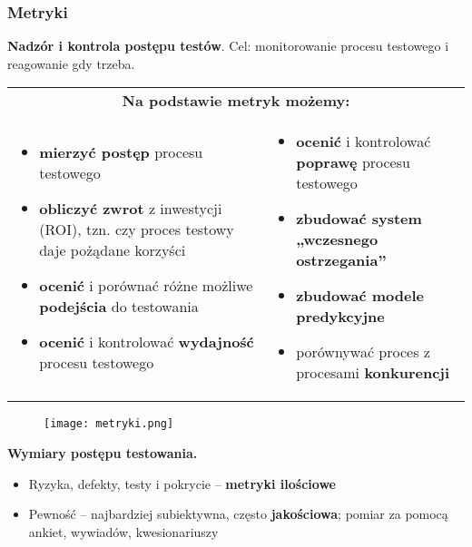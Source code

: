 \documentclass[../main.tex]{subfiles}
\begin{document}
    \subsubsection{Metryki}

    \textbf{Nadzór i kontrola postępu testów}. Cel: monitorowanie procesu testowego i reagowanie gdy trzeba.

    \begin{table}[H]
        \begin{center}
            \begin{tabular}{p{8cm} p{8cm}}
                \multicolumn{2}{c}{\textbf{ Na podstawie metryk możemy:}}\\
                \begin{itemize}
                    \item \textbf{mierzyć postęp} procesu testowego
                    \item \textbf{obliczyć zwrot} z inwestycji (ROI), tzn. czy proces testowy daje pożądane korzyści
                    \item \textbf{ocenić} i porównać różne możliwe \textbf{podejścia} do testowania
                    \item \textbf{ocenić} i kontrolować \textbf{wydajność} procesu testowego
                \end{itemize}
                &
                \begin{itemize}
                    \item \textbf{ocenić} i kontrolować \textbf{poprawę} procesu testowego
                    \item \textbf{zbudować system „wczesnego ostrzegania”}
                    \item \textbf{zbudować modele predykcyjne}
                    \item porównywać proces z procesami \textbf{konkurencji}
                \end{itemize}\\
            \end{tabular}
        \end{center}
    \end{table}

    \begin{figure}[H]
        \texttt{[image: metryki.png]}
    \end{figure}

    \textbf{Wymiary postępu testowania.}
    \begin{itemize}
        \item Ryzyka, defekty, testy i pokrycie – \textbf{metryki ilościowe}
        \item Pewność – najbardziej subiektywna, często \textbf{jakościowa}; pomiar za pomocą ankiet, wywiadów, kwesionariuszy
    \end{itemize}
\end{document}
